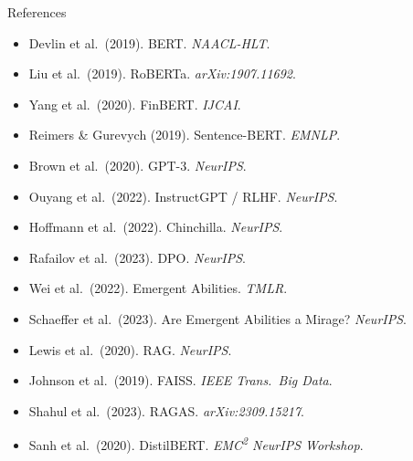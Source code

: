 \documentclass[11pt,aspectratio=169,professionalfonts]{beamer}
\begin{document}
\begin{frame}{References}
  \begin{itemize}
    \setlength\itemsep{0.2em}
    \small
    \item Devlin et al.\ (2019). BERT. \textit{NAACL-HLT}.
    \item Liu et al.\ (2019). RoBERTa. \textit{arXiv:1907.11692}.
    \item Yang et al.\ (2020). FinBERT. \textit{IJCAI}.
    \item Reimers \& Gurevych (2019). Sentence-BERT. \textit{EMNLP}.
    \item Brown et al.\ (2020). GPT-3. \textit{NeurIPS}.
    \item Ouyang et al.\ (2022). InstructGPT / RLHF. \textit{NeurIPS}.
    \item Hoffmann et al.\ (2022). Chinchilla. \textit{NeurIPS}.
    \item Rafailov et al.\ (2023). DPO. \textit{NeurIPS}.
    \item Wei et al.\ (2022). Emergent Abilities. \textit{TMLR}.
    \item Schaeffer et al.\ (2023). Are Emergent Abilities a Mirage? \textit{NeurIPS}.
    \item Lewis et al.\ (2020). RAG. \textit{NeurIPS}.
    \item Johnson et al.\ (2019). FAISS. \textit{IEEE Trans.\ Big Data}.
    \item Shahul et al.\ (2023). RAGAS. \textit{arXiv:2309.15217}.
    \item Sanh et al.\ (2020). DistilBERT. \textit{EMC\textsuperscript{2} NeurIPS Workshop}.
  \end{itemize}
\end{frame}
%
%
\end{document}
